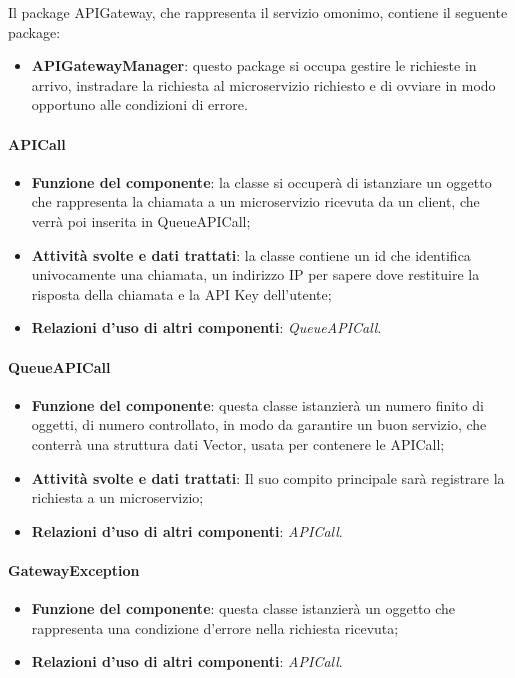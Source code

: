 Il package APIGateway, che rappresenta il servizio omonimo, contiene il seguente package:

\begin{itemize}
	\item \textbf{APIGatewayManager}: questo package si occupa gestire le richieste in arrivo, instradare la richiesta al microservizio richiesto e di ovviare in modo opportuno alle condizioni di errore.
\end{itemize}

\paragraph{APICall}
\begin{itemize}
	\item \textbf{Funzione del componente}: la classe si occuper\`{a} di istanziare un oggetto che rappresenta la chiamata a un microservizio ricevuta da un client, che verrà poi inserita in QueueAPICall;
	\item \textbf{Attivit\`{a} svolte e dati trattati}: la classe contiene un id che identifica univocamente una chiamata, un indirizzo IP per sapere dove restituire la risposta della chiamata e la API Key dell'utente;
	\item \textbf{Relazioni d'uso di altri componenti}: \textit{QueueAPICall}.
\end{itemize}

\paragraph{QueueAPICall}
\begin{itemize}
	\item \textbf{Funzione del componente}: questa classe istanzier\`{a} un numero finito di oggetti, di numero controllato, in modo da garantire un buon servizio, che conterr\`{a} una struttura dati Vector, usata per contenere le APICall;
	\item \textbf{Attivit\`{a} svolte e dati trattati}:  Il suo compito principale sar\`{a} registrare la richiesta a un microservizio;
	\item \textbf{Relazioni d'uso di altri componenti}: \textit{APICall}.
\end{itemize}

\paragraph{GatewayException}
\begin{itemize}
	\item \textbf{Funzione del componente}: questa classe istanzier\`{a} un oggetto che rappresenta una condizione d'errore nella richiesta ricevuta;
	\item \textbf{Relazioni d'uso di altri componenti}: \textit{APICall}.
\end{itemize}

